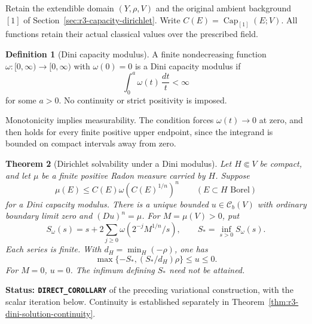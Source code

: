 \documentclass[11pt,a4paper]{article}
\numberwithin{equation}{section}
\newtheorem{theorem}{Theorem}[section]
\theoremstyle{definition}
\newtheorem{definition}[theorem]{Definition}
\theoremstyle{remark}
\newcommand{\Cb}{\mathcal C_b}
\begin{document}
Retain the extendible domain $(Y,\rho,V)$ and the original ambient
background $[1]$ of Section~\ref{sec:r3-capacity-dirichlet}. Write
$C(E)=\operatorname{Cap}_{[1]}(E;V)$. All functions retain their
actual classical values over the prescribed field.

\begin{definition}[Dini capacity modulus]
\label{def:r3-dini-capacity-modulus}
A finite nondecreasing function $\omega:[0,\infty)\to[0,\infty)$
with $\omega(0)=0$ is a Dini capacity modulus if
\begin{equation}\label{eq:r3-dini-integrability}
 \int_0^a\omega(t)\,\frac{dt}{t}<\infty
\end{equation}
for some $a>0$. No continuity or strict positivity is imposed.
\end{definition}

Monotonicity implies measurability. The condition forces
$\omega(t)\to0$ at zero, and then holds for every finite positive
upper endpoint, since the integrand is bounded on compact intervals
away from zero.

\begin{theorem}[Dirichlet solvability under a Dini modulus]
\label{thm:r3-dini-capacity-dirichlet}
Let $H\Subset V$ be compact, and let $\mu$ be a finite positive
Radon measure carried by $H$. Suppose
\begin{equation}\label{eq:r3-dini-capacity-hypothesis}
 \mu(E)\leq C(E)\omega(C(E)^{1/n})^n
       \qquad(E\subset H\text{ Borel})
\end{equation}
for a Dini capacity modulus. There is a unique bounded
$u\in\Cb(V)$ with ordinary boundary limit zero and $(Du)^n=\mu$.
For $M=\mu(V)>0$, put
\begin{equation}\label{eq:r3-dini-S}
 S_\omega(s)=s+2\sum_{j\geq0}\omega(2^{-j}M^{1/n}/s),
 \qquad S_* =\inf_{s>0}S_\omega(s).
\end{equation}
Each series is finite. With $d_H=\min_H(-\rho)$, one has
\begin{equation}\label{eq:r3-dini-solution-bound}
 \max\{-S_*,(S_*/d_H)\rho\}\leq u\leq0.
\end{equation}
For $M=0$, $u=0$. The infimum defining $S_*$ need not be attained.
\end{theorem}

\noindent\textbf{Status: \texttt{DIRECT\_COROLLARY}} of the
preceding variational construction, with the scalar iteration below.
Continuity is established separately in
Theorem~\ref{thm:r3-dini-solution-continuity}.
\end{document}
